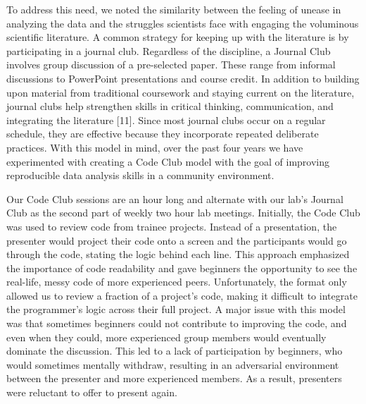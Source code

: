 \documentclass[
  11pt,
]{article}
\begin{document}
To address this need, we noted the similarity between the feeling of
unease in analyzing the data and the struggles scientists face with
engaging the voluminous scientific literature. A common strategy for
keeping up with the literature is by participating in a journal club.
Regardless of the discipline, a Journal Club involves group discussion
of a pre-selected paper. These range from informal discussions to
PowerPoint presentations and course credit. In addition to building upon
material from traditional coursework and staying current on the
literature, journal clubs help strengthen skills in critical thinking,
communication, and integrating the literature {[}11{]}. Since most
journal clubs occur on a regular schedule, they are effective because
they incorporate repeated deliberate practices. With this model in mind,
over the past four years we have experimented with creating a Code Club
model with the goal of improving reproducible data analysis skills in a
community environment.

Our Code Club sessions are an hour long and alternate with our lab's
Journal Club as the second part of weekly two hour lab meetings.
Initially, the Code Club was used to review code from trainee projects.
Instead of a presentation, the presenter would project their code onto a
screen and the participants would go through the code, stating the logic
behind each line. This approach emphasized the importance of code
readability and gave beginners the opportunity to see the real-life,
messy code of more experienced peers. Unfortunately, the format only
allowed us to review a fraction of a project's code, making it difficult
to integrate the programmer's logic across their full project. A major
issue with this model was that sometimes beginners could not contribute
to improving the code, and even when they could, more experienced group
members would eventually dominate the discussion. This led to a lack of
participation by beginners, who would sometimes mentally withdraw,
resulting in an adversarial environment between the presenter and more
experienced members. As a result, presenters were reluctant to offer to
present again.
\end{document}
